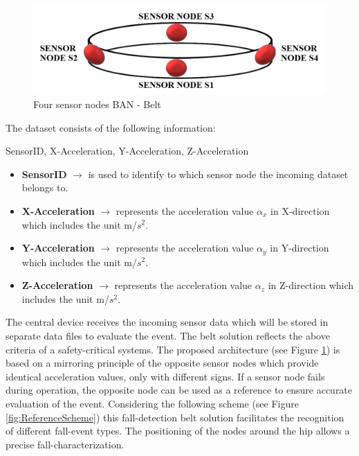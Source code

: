 \documentclass[review]{elsarticle}
\begin{document}
\begin{figure}[!ht]
	\centering
	\includegraphics[scale=0.42]{Images/belt}
	\caption[Four sensor nodes BAN - Belt]{Four sensor nodes BAN - Belt \cite{LaBlunda.2016, LaBlunda.2016b}}
	\label{fig:BanBelt}
\end{figure}

 The dataset consists of the following information: 
\begin{center}
 SensorID, X-Acceleration, Y-Acceleration, Z-Acceleration
\end{center}
\begin{itemize}
	\item \textbf{SensorID} $\rightarrow$ is used to identify to which sensor node the incoming dataset belongs to.
	\item \textbf{X-Acceleration} $\rightarrow$ represents the acceleration value $\alpha_{x}$ in X-direction which includes the unit m/$s^2$.
	\item \textbf{Y-Acceleration} $\rightarrow$ represents the acceleration value $\alpha_{y}$ in Y-direction which includes the unit m/$s^2$.
	\item \textbf{Z-Acceleration} $\rightarrow$ represents the acceleration value $\alpha_{z}$ in Z-direction which includes the unit m/$s^2$.
\end{itemize}
The central device receives the incoming sensor data which will be stored in separate data files to evaluate the event. 
The belt solution reflects the above criteria of a safety-critical systems. The proposed architecture (see Figure \ref{fig:BanBelt}) is based on a mirroring principle of the opposite sensor nodes which provide identical acceleration values, only with different signs. If a sensor node fails during operation, the opposite node can be used as a reference to ensure accurate evaluation of the event.  Considering the following scheme (see Figure \ref{fig:ReferenceScheme}) this fall-detection belt solution facilitates the recognition of different fall-event types. The positioning of the nodes around the hip allows a precise fall-characterization.
\end{document}
